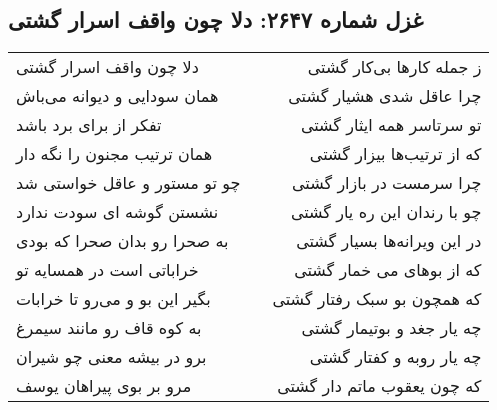 \begin{center}
\section*{غزل شماره ۲۶۴۷: دلا چون واقف اسرار گشتی}
\label{sec:2647}
\begin{longtable}{l p{0.5cm} r}
دلا چون واقف اسرار گشتی
&&
ز جمله کارها بی‌کار گشتی
\\
همان سودایی و دیوانه می‌باش
&&
چرا عاقل شدی هشیار گشتی
\\
تفکر از برای برد باشد
&&
تو سرتاسر همه ایثار گشتی
\\
همان ترتیب مجنون را نگه دار
&&
که از ترتیب‌ها بیزار گشتی
\\
چو تو مستور و عاقل خواستی شد
&&
چرا سرمست در بازار گشتی
\\
نشستن گوشه ای سودت ندارد
&&
چو با رندان این ره یار گشتی
\\
به صحرا رو بدان صحرا که بودی
&&
در این ویرانه‌ها بسیار گشتی
\\
خراباتی است در همسایه تو
&&
که از بوهای می خمار گشتی
\\
بگیر این بو و می‌رو تا خرابات
&&
که همچون بو سبک رفتار گشتی
\\
به کوه قاف رو مانند سیمرغ
&&
چه یار جغد و بوتیمار گشتی
\\
برو در بیشه معنی چو شیران
&&
چه یار روبه و کفتار گشتی
\\
مرو بر بوی پیراهان یوسف
&&
که چون یعقوب ماتم دار گشتی
\\
\end{longtable}
\end{center}
